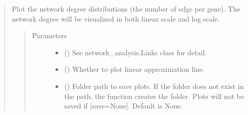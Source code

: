 \documentclass[letterpaper,10pt,english]{sphinxmanual}
\begin{document}
\begin{quote}
\begin{fulllineitems}
\begin{fulllineitems}
\label{\detokenize{modules/celloracle.network_analysis:celloracle.network_analysis.Links.plot_degree_distributions}}
Plot the network degree distributions (the number of edge per gene).
The network degree will be visualized in both linear scale and log scale.
\begin{quote}\begin{description}
\item[{Parameters}] \leavevmode\begin{itemize}
\item {} 
 ({\hyperref[\detokenize{modules/celloracle:celloracle.Links}]{}}) \textendash{} See network\_analysis.Links class for detail.

\item {} 
 () \textendash{} Whether to plot linear approximation line.

\item {} 
 () \textendash{} Folder path to save plots. If the folder does not exist in the path, the function creates the folder.
Plots will not be saved if {[}save=None{]}. Default is None.

\end{itemize}

\end{description}\end{quote}

\end{fulllineitems}



\end{fulllineitems}
\end{quote}
\end{document}
